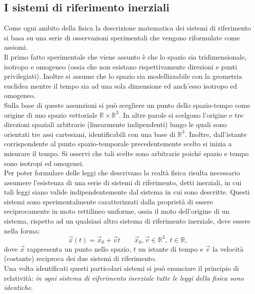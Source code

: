 \subsection{I sistemi di riferimento inerziali}
Come ogni ambito della fisica la descrizione matematica dei sistemi di riferimento si basa su una serie di osservazioni sperimentali che vengono riformulate come assiomi.\\

Il primo fatto sperimentale che viene assunto è che lo spazio sia tridimensionale, isotropo e omogeneo (ossia che non esistano rispettivamente direzioni e punti privilegiati). Inoltre si assume che lo spazio sia modellizzabile con la 
geometria euclidea mentre il tempo sia ad una sola dimensione ed anch'esso isotropo ed omogeneo.\\
Sulla base di queste assunzioni si può scegliere un punto dello spazio-tempo come 
origine di uno spazio vettoriale $\mathbb{R}\times\mathbb{R}^3$. In altre parole si scelgono l'origine e tre direzioni spaziali arbitrarie (linearmente indipendenti) lungo le quali sono orientati tre assi cartesiani, identificabili con una base di $\mathbb{R}^3$.
Inoltre, dall'istante corrispondente al punto spazio-temporale precedentemente scelto si inizia a misurare il tempo. Si osservi che tali scelte sono arbitrarie poiché spazio e tempo sono isotropi ed omogenei.\\

Per poter formulare delle leggi che descrivano la realtà fisica risulta necessario assumere l'esistenza di una serie di sistemi di riferimento, detti inerziali, in cui tali leggi siano valide indipendentemente dal sistema in cui sono descritte. Questi sistemi sono sperimentalmente caratterizzati dalla proprietà di essere reciprocamente in moto rettilineo uniforme, ossia il moto dell'origine di un sistema, rispetto ad un qualsiasi altro sistema di riferimento inerziale, deve essere nella forma: 
\begin{equation}
	\vec x(t)=\vec x_0+\vec vt \qquad \vec x_0,\vec v\in \mathbb{R}^3, \ t\in\mathbb{R},
\end{equation}
dove $\vec x$ rappresenta un punto nello spazio, $t$ un istante di tempo e $\vec v$ la velocità (costante) reciproca dei due sistemi di riferimento.\\
Una volta identificati questi particolari sistemi  si può enunciare il principio di relatività: \emph{in ogni sistema di riferimento inerziale tutte le leggi della fisica sono identiche}.\\

